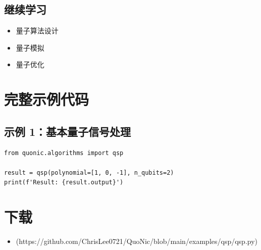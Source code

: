 \documentclass[12pt,a4paper]{article}
\begin{document}
\subsection{继续学习}
\begin{itemize}
  \item 量子算法设计
  \item 量子模拟
  \item 量子优化
\end{itemize}

\section{完整示例代码}

\subsection{示例 1：基本量子信号处理}

\begin{verbatim}
from quonic.algorithms import qsp

result = qsp(polynomial=[1, 0, -1], n_qubits=2)
print(f'Result: {result.output}')
\end{verbatim}

\section{下载}

\begin{itemize}
  \item [qsp.py](https://github.com/ChrisLee0721/QuoNic/blob/main/examples/qsp/qsp.py)
\end{itemize}
\end{document}
